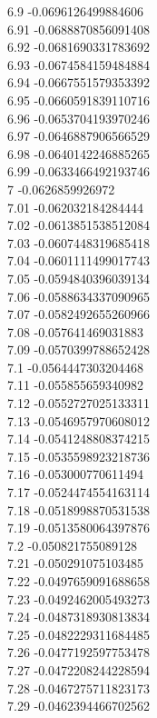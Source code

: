 {6.9	-0.0696126499884606\\
6.91	-0.0688870856091408\\
6.92	-0.0681690331783692\\
6.93	-0.0674584159484884\\
6.94	-0.0667551579353392\\
6.95	-0.0660591839110716\\
6.96	-0.0653704193970246\\
6.97	-0.0646887906566529\\
6.98	-0.0640142246885265\\
6.99	-0.0633466492193746\\
7	-0.0626859926972\\
7.01	-0.062032184284444\\
7.02	-0.0613851538512084\\
7.03	-0.0607448319685418\\
7.04	-0.0601111499017743\\
7.05	-0.0594840396039134\\
7.06	-0.0588634337090965\\
7.07	-0.0582492655260966\\
7.08	-0.057641469031883\\
7.09	-0.0570399788652428\\
7.1	-0.0564447303204468\\
7.11	-0.055855659340982\\
7.12	-0.0552727025133311\\
7.13	-0.0546957970608012\\
7.14	-0.0541248808374215\\
7.15	-0.0535598923218736\\
7.16	-0.053000770611494\\
7.17	-0.0524474554163114\\
7.18	-0.0518998870531538\\
7.19	-0.0513580064397876\\
7.2	-0.050821755089128\\
7.21	-0.050291075103485\\
7.22	-0.0497659091688658\\
7.23	-0.0492462005493273\\
7.24	-0.0487318930813834\\
7.25	-0.0482229311684485\\
7.26	-0.0477192597753478\\
7.27	-0.0472208244228594\\
7.28	-0.0467275711823173\\
7.29	-0.0462394466702562\\
}
